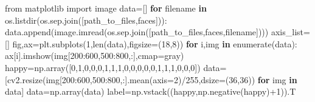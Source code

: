 \documentclass[
  letterpaper,
  DIV=11,
  numbers=noendperiod]{scrartcl}
\newenvironment{Shaded}{\begin{snugshade}}{\end{snugshade}}
\newcommand{\BuiltInTok}[1]{\textcolor[rgb]{0.00,0.23,0.31}{#1}}
\newcommand{\ControlFlowTok}[1]{\textcolor[rgb]{0.00,0.23,0.31}{\textbf{#1}}}
\newcommand{\DecValTok}[1]{\textcolor[rgb]{0.68,0.00,0.00}{#1}}
\newcommand{\ImportTok}[1]{\textcolor[rgb]{0.00,0.46,0.62}{#1}}
\newcommand{\KeywordTok}[1]{\textcolor[rgb]{0.00,0.23,0.31}{\textbf{#1}}}
\newcommand{\NormalTok}[1]{\textcolor[rgb]{0.00,0.23,0.31}{#1}}
\newcommand{\OperatorTok}[1]{\textcolor[rgb]{0.37,0.37,0.37}{#1}}
\newcommand{\StringTok}[1]{\textcolor[rgb]{0.13,0.47,0.30}{#1}}
\begin{document}
\begin{Shaded}
\begin{Highlighting}[]
\ImportTok{from}\NormalTok{ matplotlib }\ImportTok{import}\NormalTok{ image }
\NormalTok{data}\OperatorTok{=}\NormalTok{[]}
\ControlFlowTok{for}\NormalTok{ filename }\KeywordTok{in}\NormalTok{ os.listdir(os.sep.join([path\_to\_files,}\StringTok{\textquotesingle{}faces\textquotesingle{}}\NormalTok{])):}
\NormalTok{    data.append(image.imread(os.sep.join([path\_to\_files,}\StringTok{\textquotesingle{}faces\textquotesingle{}}\NormalTok{,filename])))}
\NormalTok{axis\_list}\OperatorTok{=}\NormalTok{[]}
\NormalTok{fig,ax}\OperatorTok{=}\NormalTok{plt.subplots(}\DecValTok{1}\NormalTok{,}\BuiltInTok{len}\NormalTok{(data),figsize}\OperatorTok{=}\NormalTok{(}\DecValTok{18}\NormalTok{,}\DecValTok{8}\NormalTok{))}
\ControlFlowTok{for}\NormalTok{ i,img }\KeywordTok{in} \BuiltInTok{enumerate}\NormalTok{(data):}
\NormalTok{    ax[i].imshow(img[}\DecValTok{200}\NormalTok{:}\DecValTok{600}\NormalTok{,}\DecValTok{500}\NormalTok{:}\DecValTok{800}\NormalTok{,:],cmap}\OperatorTok{=}\StringTok{\textquotesingle{}gray\textquotesingle{}}\NormalTok{)}
\NormalTok{happy}\OperatorTok{=}\NormalTok{np.array([}\DecValTok{0}\NormalTok{,}\DecValTok{1}\NormalTok{,}\DecValTok{0}\NormalTok{,}\DecValTok{0}\NormalTok{,}\DecValTok{0}\NormalTok{,}\DecValTok{1}\NormalTok{,}\DecValTok{1}\NormalTok{,}\DecValTok{1}\NormalTok{,}\DecValTok{0}\NormalTok{,}\DecValTok{0}\NormalTok{,}\DecValTok{0}\NormalTok{,}\DecValTok{0}\NormalTok{,}\DecValTok{0}\NormalTok{,}\DecValTok{1}\NormalTok{,}\DecValTok{1}\NormalTok{,}\DecValTok{1}\NormalTok{,}\DecValTok{0}\NormalTok{,}\DecValTok{0}\NormalTok{,}\DecValTok{0}\NormalTok{])}
\NormalTok{data}\OperatorTok{=}\NormalTok{[cv2.resize(img[}\DecValTok{200}\NormalTok{:}\DecValTok{600}\NormalTok{,}\DecValTok{500}\NormalTok{:}\DecValTok{800}\NormalTok{,:].mean(axis}\OperatorTok{=}\DecValTok{2}\NormalTok{)}\OperatorTok{/}\DecValTok{255}\NormalTok{,dsize}\OperatorTok{=}\NormalTok{(}\DecValTok{36}\NormalTok{,}\DecValTok{36}\NormalTok{)) }\ControlFlowTok{for}\NormalTok{ img }\KeywordTok{in}\NormalTok{ data]}
\NormalTok{data}\OperatorTok{=}\NormalTok{np.array(data)}
\NormalTok{label}\OperatorTok{=}\NormalTok{np.vstack((happy,np.negative(happy)}\OperatorTok{+}\DecValTok{1}\NormalTok{)).T}
\end{Highlighting}
\end{Shaded}
\end{document}
